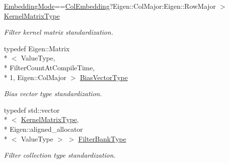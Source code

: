 \begin{DoxyCompactItemize}
\hyperlink{namespaceffnn_1_1layer_a254f16beba4fb335d935e9b43bb9e69a}{Embedding\-Mode}==\hyperlink{namespaceffnn_1_1layer_a254f16beba4fb335d935e9b43bb9e69aaede1065f5863208cae7e55561966a182}{Col\-Embedding}?Eigen\-::\-Col\-Major\-:\-Eigen\-::\-Row\-Major $>$ \hyperlink{classffnn_1_1layer_1_1_receptive_volume_af207f604ba81e52546c400dd85de014f}{Kernel\-Matrix\-Type}
\begin{DoxyCompactList}\small\item\em Filter kernel matrix standardization. \end{DoxyCompactList}\item 
typedef Eigen\-::\-Matrix\\*
$<$ Value\-Type, \\*
Filter\-Count\-At\-Compile\-Time, \\*
1, Eigen\-::\-Col\-Major $>$ \hyperlink{classffnn_1_1layer_1_1_receptive_volume_a22ec68a5323233ca8bbcacc2b7387dbb}{Bias\-Vector\-Type}
\begin{DoxyCompactList}\small\item\em Bias vector type standardization. \end{DoxyCompactList}\item 
typedef std\-::vector\\*
$<$ \hyperlink{classffnn_1_1layer_1_1_receptive_volume_af207f604ba81e52546c400dd85de014f}{Kernel\-Matrix\-Type}, \\*
Eigen\-::aligned\-\_\-allocator\\*
$<$ Value\-Type $>$ $>$ \hyperlink{classffnn_1_1layer_1_1_receptive_volume_a7c97795baaf3c9b1e7db3cb3841d8829}{Filter\-Bank\-Type}
\begin{DoxyCompactList}\small\item\em Filter collection type standardization. \end{DoxyCompactList}\end{DoxyCompactItemize}
